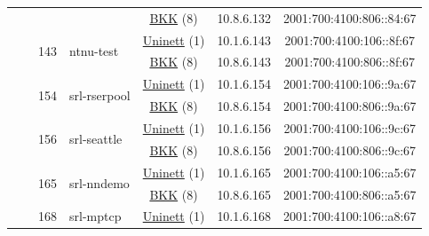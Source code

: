 \begin{small}
\begin{center}
\begin{longtable}{|c|c|c|c|c|c|c|c|}
  &  &  &  & \multicolumn{2}{|c|}{\tiny{\href{http://bkk.no}{BKK} (8)}} & \tiny{10.8.6.132} & \tiny{2001:700:4100:806::84:67} \\* \cline{3-3}\cline{4-4}\cline{5-5}\cline{6-6}\cline{7-7}\cline{8-8}
  &  & \multirow{2}{*}{\tiny{143}} & \multicolumn{1}{|l|}{\multirow{2}{*}{\tiny{ntnu-test}}} & \multicolumn{2}{|c|}{\tiny{\href{https://www.uninett.no}{Uninett} (1)}} & \tiny{10.1.6.143} & \tiny{2001:700:4100:106::8f:67} \\* \cline{5-5}\cline{6-6}\cline{7-7}\cline{8-8}
  &  &  &  & \multicolumn{2}{|c|}{\tiny{\href{http://bkk.no}{BKK} (8)}} & \tiny{10.8.6.143} & \tiny{2001:700:4100:806::8f:67} \\* \cline{3-3}\cline{4-4}\cline{5-5}\cline{6-6}\cline{7-7}\cline{8-8}
  &  & \multirow{2}{*}{\tiny{154}} & \multicolumn{1}{|l|}{\multirow{2}{*}{\tiny{srl-rserpool}}} & \multicolumn{2}{|c|}{\tiny{\href{https://www.uninett.no}{Uninett} (1)}} & \tiny{10.1.6.154} & \tiny{2001:700:4100:106::9a:67} \\* \cline{5-5}\cline{6-6}\cline{7-7}\cline{8-8}
  &  &  &  & \multicolumn{2}{|c|}{\tiny{\href{http://bkk.no}{BKK} (8)}} & \tiny{10.8.6.154} & \tiny{2001:700:4100:806::9a:67} \\* \cline{3-3}\cline{4-4}\cline{5-5}\cline{6-6}\cline{7-7}\cline{8-8}
  &  & \multirow{2}{*}{\tiny{156}} & \multicolumn{1}{|l|}{\multirow{2}{*}{\tiny{srl-seattle}}} & \multicolumn{2}{|c|}{\tiny{\href{https://www.uninett.no}{Uninett} (1)}} & \tiny{10.1.6.156} & \tiny{2001:700:4100:106::9c:67} \\* \cline{5-5}\cline{6-6}\cline{7-7}\cline{8-8}
  &  &  &  & \multicolumn{2}{|c|}{\tiny{\href{http://bkk.no}{BKK} (8)}} & \tiny{10.8.6.156} & \tiny{2001:700:4100:806::9c:67} \\* \cline{3-3}\cline{4-4}\cline{5-5}\cline{6-6}\cline{7-7}\cline{8-8}
  &  & \multirow{2}{*}{\tiny{165}} & \multicolumn{1}{|l|}{\multirow{2}{*}{\tiny{srl-nndemo}}} & \multicolumn{2}{|c|}{\tiny{\href{https://www.uninett.no}{Uninett} (1)}} & \tiny{10.1.6.165} & \tiny{2001:700:4100:106::a5:67} \\* \cline{5-5}\cline{6-6}\cline{7-7}\cline{8-8}
  &  &  &  & \multicolumn{2}{|c|}{\tiny{\href{http://bkk.no}{BKK} (8)}} & \tiny{10.8.6.165} & \tiny{2001:700:4100:806::a5:67} \\* \cline{3-3}\cline{4-4}\cline{5-5}\cline{6-6}\cline{7-7}\cline{8-8}
  &  & \multirow{2}{*}{\tiny{168}} & \multicolumn{1}{|l|}{\multirow{2}{*}{\tiny{srl-mptcp}}} & \multicolumn{2}{|c|}{\tiny{\href{https://www.uninett.no}{Uninett} (1)}} & \tiny{10.1.6.168} & \tiny{2001:700:4100:106::a8:67} \\* \cline{5-5}\cline{6-6}\cline{7-7}\cline{8-8}

\end{longtable}
\end{center}
\end{small}
